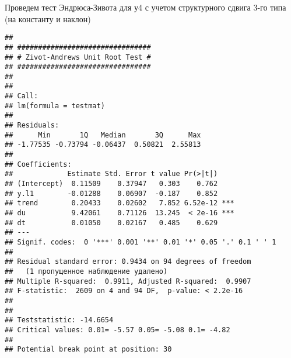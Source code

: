 \documentclass[
]{article}
\newenvironment{Shaded}{\begin{snugshade}}{\end{snugshade}}
\newcommand{\AttributeTok}[1]{\textcolor[rgb]{0.13,0.29,0.53}{#1}}
\newcommand{\FunctionTok}[1]{\textcolor[rgb]{0.13,0.29,0.53}{\textbf{#1}}}
\newcommand{\NormalTok}[1]{#1}
\newcommand{\SpecialCharTok}[1]{\textcolor[rgb]{0.81,0.36,0.00}{\textbf{#1}}}
\newcommand{\StringTok}[1]{\textcolor[rgb]{0.31,0.60,0.02}{#1}}
\begin{document}
Проведем тест Эндрюса-Зивота для у4 с учетом структурного сдвига 3-го
типа (на константу и наклон)

\begin{Shaded}
\end{Shaded}

\begin{verbatim}
## 
## ################################ 
## # Zivot-Andrews Unit Root Test # 
## ################################ 
## 
## 
## Call:
## lm(formula = testmat)
## 
## Residuals:
##      Min       1Q   Median       3Q      Max 
## -1.77535 -0.73794 -0.06437  0.50821  2.55813 
## 
## Coefficients:
##             Estimate Std. Error t value Pr(>|t|)    
## (Intercept)  0.11509    0.37947   0.303    0.762    
## y.l1        -0.01288    0.06907  -0.187    0.852    
## trend        0.20433    0.02602   7.852 6.52e-12 ***
## du           9.42061    0.71126  13.245  < 2e-16 ***
## dt           0.01050    0.02167   0.485    0.629    
## ---
## Signif. codes:  0 '***' 0.001 '**' 0.01 '*' 0.05 '.' 0.1 ' ' 1
## 
## Residual standard error: 0.9434 on 94 degrees of freedom
##   (1 пропущенное наблюдение удалено)
## Multiple R-squared:  0.9911, Adjusted R-squared:  0.9907 
## F-statistic:  2609 on 4 and 94 DF,  p-value: < 2.2e-16
## 
## 
## Teststatistic: -14.6654 
## Critical values: 0.01= -5.57 0.05= -5.08 0.1= -4.82 
## 
## Potential break point at position: 30
\end{verbatim}
\end{document}
